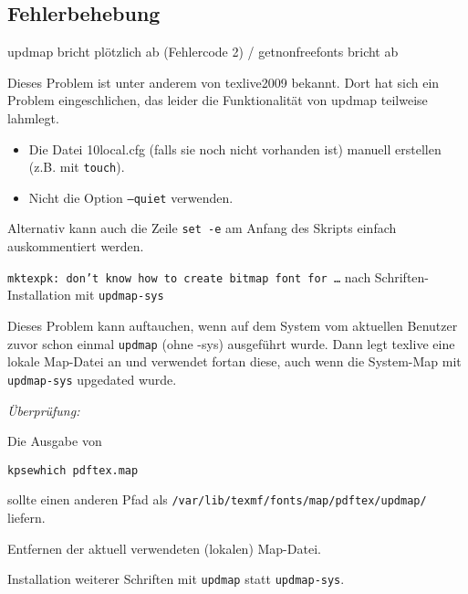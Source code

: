 \subsection{Fehlerbehebung}

\begin{itemize}

\begin{knownissue}{%
  updmap bricht plötzlich ab (Fehlercode 2) / getnonfreefonts bricht ab
}

Dieses Problem ist unter anderem von texlive2009 bekannt.
Dort hat sich ein Problem eingeschlichen, das leider die Funktionalität von
updmap teilweise lahmlegt.

\begin{itemize}
  \item Die Datei 10local.cfg (falls sie noch nicht vorhanden ist) manuell
    erstellen (z.B. mit \texttt{touch}).
  \item Nicht die Option \texttt{--quiet} verwenden.
\end{itemize}

Alternativ kann auch die Zeile \lstinline{set -e} am Anfang des Skripts einfach auskommentiert werden.
\end{knownissue}


\begin{knownissue}{
  \texttt{mktexpk: don't know how to create bitmap font for \ldots}\newline
  nach Schriften-Installation mit \lstinline{updmap-sys}}

Dieses Problem kann auftauchen, wenn auf dem System vom aktuellen Benutzer
zuvor schon einmal \lstinline{updmap} (ohne -sys) ausgeführt wurde.
Dann legt texlive eine lokale Map-Datei an und verwendet fortan diese,
auch wenn die System-Map mit \lstinline{updmap-sys} upgedated wurde.

\noindent\textit{Überprüfung:}

Die Ausgabe von
\begin{lstlisting}[style=cmd]
kpsewhich pdftex.map
\end{lstlisting}
sollte einen anderen Pfad als
\lstinline{/var/lib/texmf/fonts/map/pdftex/updmap/} liefern.


Entfernen der aktuell verwendeten (lokalen) Map-Datei.


Installation weiterer Schriften mit \lstinline{updmap} statt
\lstinline{updmap-sys}.

\end{knownissue}

\end{itemize}

